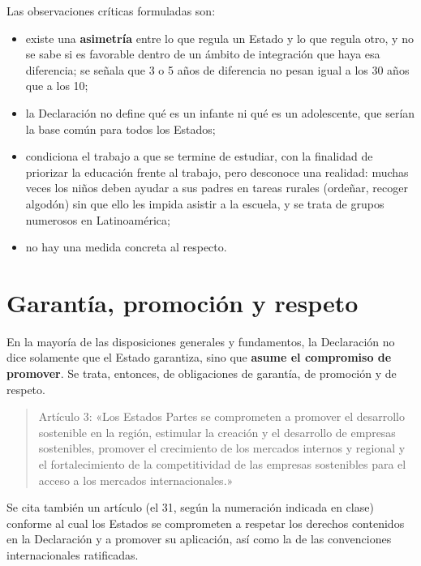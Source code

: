 \documentclass[12pt,oneside]{book}
\begin{document}
Las observaciones críticas formuladas son:
\begin{itemize}
    \item existe una \textbf{asimetría} entre lo que regula un Estado y lo que regula otro, y no se sabe si es favorable dentro de un ámbito de integración que haya esa diferencia; se señala que 3 o 5 años de diferencia no pesan igual a los 30 años que a los 10;
    \item la Declaración no define qué es un infante ni qué es un adolescente, que serían la base común para todos los Estados;
    \item condiciona el trabajo a que se termine de estudiar, con la finalidad de priorizar la educación frente al trabajo, pero desconoce una realidad: muchas veces los niños deben ayudar a sus padres en tareas rurales (ordeñar, recoger algodón) sin que ello les impida asistir a la escuela, y se trata de grupos numerosos en Latinoamérica;
    \item no hay una medida concreta al respecto.
\end{itemize}

\section{Garantía, promoción y respeto}

En la mayoría de las disposiciones generales y fundamentos, la Declaración no dice solamente que el Estado garantiza, sino que \textbf{asume el compromiso de promover}. Se trata, entonces, de obligaciones de garantía, de promoción y de respeto.

\begin{quote}
Artículo 3: «Los Estados Partes se comprometen a promover el desarrollo sostenible en la región, estimular la creación y el desarrollo de empresas sostenibles, promover el crecimiento de los mercados internos y regional y el fortalecimiento de la competitividad de las empresas sostenibles para el acceso a los mercados internacionales.»
\end{quote}

Se cita también un artículo (el 31, según la numeración indicada en clase) conforme al cual los Estados se comprometen a respetar los derechos contenidos en la Declaración y a promover su aplicación, así como la de las convenciones internacionales ratificadas.
\end{document}
